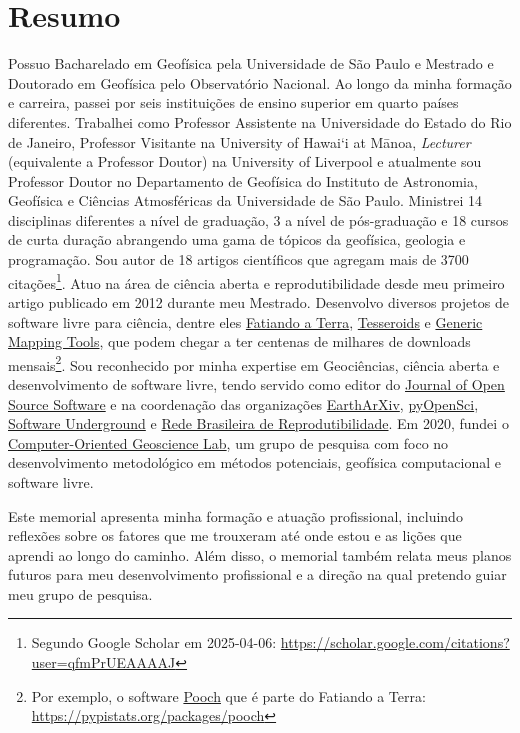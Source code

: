 \documentclass[12pt,a4paper,oneside]{book}
\newcommand{\USP}{Universidade de São Paulo}
\newcommand{\IAG}{Instituto de Astronomia, Geofísica e Ciências Atmosféricas}
\newcommand{\UoL}{University of Liverpool}
\newcommand{\ON}{Observatório Nacional}
\newcommand{\UHM}{University of Hawai`i at M\={a}noa}
\newcommand{\UERJ}{Universidade do Estado do Rio de Janeiro}
\newcommand{\GMTLink}{\href{https://www.generic-mapping-tools.org}{Generic Mapping Tools}}
\newcommand{\CompGeoLabLink}{\href{https://www.compgeolab.org/}{Computer-Oriented Geoscience Lab}}
\newcommand{\SwungLink}{\href{https://softwareunderground.org/}{Software Underground}}
\newcommand{\FatiandoLink}{\href{https://www.fatiando.org}{Fatiando a Terra}}
\newcommand{\JOSSLink}{\href{https://joss.theoj.org/}{Journal of Open Source Software}}
\newcommand{\PyOSciLink}{\href{https://www.pyopensci.org/}{pyOpenSci}}
\newcommand{\EarthArXivLink}{\href{https://eartharxiv.org/}{EarthArXiv}}
\newcommand{\RBRLink}{\href{https://www.reprodutibilidade.org/}{Rede Brasileira de Reprodutibilidade}}
\begin{document}
\chapter*{Resumo}

Possuo Bacharelado em Geofísica pela \USP{} e Mestrado
e Doutorado em Geofísica pelo \ON{}.
Ao longo da minha formação e carreira, passei por seis instituições de ensino
superior em quarto países diferentes.
Trabalhei como Professor Assistente na \UERJ{},
Professor Visitante na \UHM{}, \textit{Lecturer} (equivalente a
Professor Doutor) na \UoL{} e
atualmente sou Professor Doutor no Departamento de Geofísica do \IAG{} da
\USP{}.
Ministrei 14 disciplinas diferentes a nível de graduação,
3 a nível de pós-graduação e 18 cursos de curta
duração abrangendo uma gama de tópicos da geofísica, geologia e programação.
Sou autor de 18 artigos científicos que agregam mais de 3700
citações\footnote{Segundo Google Scholar em 2025-04-06: \url{https://scholar.google.com/citations?user=qfmPrUEAAAAJ}}.
Atuo na área de ciência aberta e reprodutibilidade desde meu primeiro artigo
publicado em 2012 durante meu Mestrado.
Desenvolvo diversos projetos de software livre para ciência, dentre eles
\FatiandoLink{}, \href{https://tesseroids.leouieda.com}{Tesseroids}
e \GMTLink{},
que podem chegar a ter centenas de milhares de downloads
mensais\footnote{Por exemplo, o software
\href{https://github.com/fatiando/pooch}{Pooch} que é parte do Fatiando a
Terra: \url{https://pypistats.org/packages/pooch}}.
Sou reconhecido por minha expertise em Geociências, ciência aberta e
desenvolvimento de software livre, tendo servido como editor do
\JOSSLink{} e na
coordenação das organizações
\EarthArXivLink{},
\PyOSciLink{},
\SwungLink{}
e \RBRLink.
Em 2020, fundei o \CompGeoLabLink{}, um grupo de pesquisa com foco no
desenvolvimento metodológico em métodos potenciais, geofísica computacional
e software livre.

Este memorial apresenta minha formação e atuação profissional, incluindo
reflexões sobre os fatores que me trouxeram até onde estou e as lições que
aprendi ao longo do caminho.
Além disso, o memorial também relata meus planos futuros para meu
desenvolvimento profissional e a direção na qual pretendo guiar meu grupo de
pesquisa.
\end{document}
